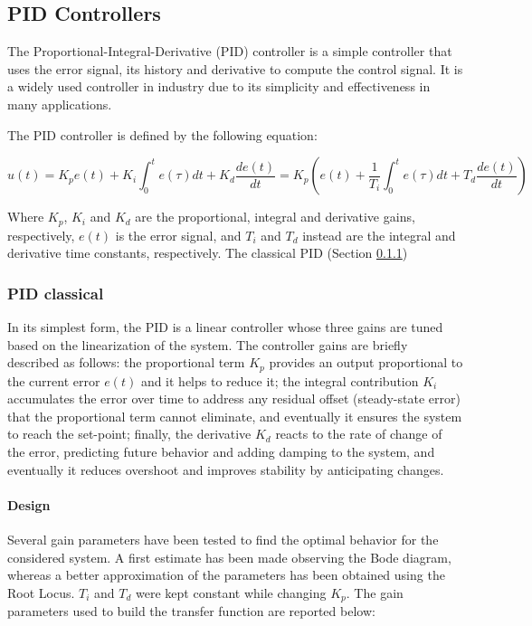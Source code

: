 \subsection{PID Controllers}
\label{subsec:pid_controllers}

The Proportional-Integral-Derivative (PID) controller is a simple controller that uses the error signal, its history and derivative to compute the control signal.
It is a widely used controller in industry due to its simplicity and effectiveness in many applications.

The PID controller is defined by the following equation:

\begin{equation}
    u(t) = K_p e(t) + K_i \int_{0}^{t} e(\tau)dt + K_d \frac{de(t)}{dt} = K_p \left(e(t) + \frac{1}{T_i} \int_{0}^{t} e(\tau)dt + T_d \frac{de(t)}{dt}\right)
\end{equation}

Where $K_p$, $K_i$ and $K_d$ are the proportional, integral and derivative gains, respectively, $e(t)$ is the error signal, and $T_i$ and $T_d$ instead are the integral and derivative time constants, respectively.
The classical PID (Section \ref{subsubsec:pid_classic})



\subsubsection{PID classical}
\label{subsubsec:pid_classic}

In its simplest form, the PID is a linear controller whose three gains are tuned based on the linearization of the system.
The controller gains are briefly described as follows: the proportional term $K_p$ provides an output proportional to the current error $e(t)$ and it helps to reduce it; the integral contribution $K_i$ accumulates the error over time to address any residual offset (steady-state error) that the proportional term cannot eliminate, and eventually it ensures the system to reach the set-point; finally, the derivative $K_d$ reacts to the rate of change of the error, predicting future behavior and adding damping to the system, and eventually it reduces overshoot and improves stability by anticipating changes.

\paragraph{Design}

Several gain parameters have been tested to find the optimal behavior for the considered system.
A first estimate  has been made observing the Bode diagram, whereas a better approximation of the parameters has been obtained using the Root Locus.
$T_i$ and $T_d$ were kept constant while changing $K_p$.
The gain parameters used to build the transfer function are reported below:

